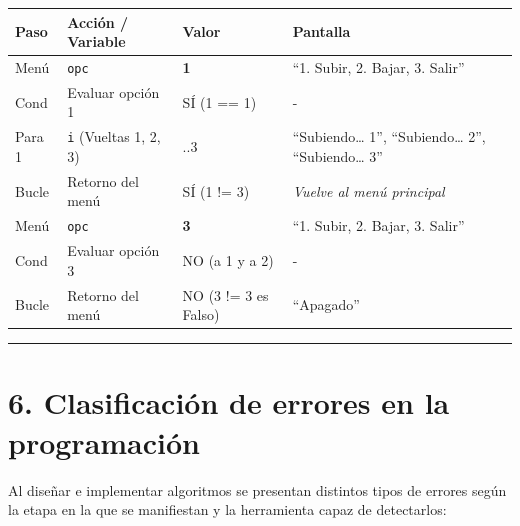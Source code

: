 {\def\LTcaptype{none} %
\begin{longtable}[]{@{}
  >{\centering\arraybackslash}p{}
  >{\centering\arraybackslash}p{}
  >{\centering\arraybackslash}p{}
  >{\raggedright\arraybackslash}p{}@{}}
\toprule\noalign{}
\begin{minipage}[b]{\linewidth}\centering
Paso
\end{minipage} & \begin{minipage}[b]{\linewidth}\centering
Acción / Variable
\end{minipage} & \begin{minipage}[b]{\linewidth}\centering
Valor
\end{minipage} & \begin{minipage}[b]{\linewidth}\raggedright
Pantalla
\end{minipage} \\
\midrule\noalign{}
\endhead
\bottomrule\noalign{}
\endlastfoot
Menú & \texttt{opc} & \textbf{1} & ``1. Subir, 2. Bajar, 3. Salir'' \\
Cond & Evaluar opción 1 & SÍ (1 == 1) & - \\
Para 1 & \texttt{i} (Vueltas 1, 2, 3) & 1..3 & ``Subiendo\ldots{} 1'',
``Subiendo\ldots{} 2'', ``Subiendo\ldots{} 3'' \\
Bucle & Retorno del menú & SÍ (1 != 3) & \emph{Vuelve al menú
principal} \\
Menú & \texttt{opc} & \textbf{3} & ``1. Subir, 2. Bajar, 3. Salir'' \\
Cond & Evaluar opción 3 & NO (a 1 y a 2) & - \\
Bucle & Retorno del menú & NO (3 != 3 es Falso) & ``Apagado'' \\
\end{longtable}
}

\begin{center}\rule{0.5\linewidth}{0.5pt}\end{center}

\section{6. Clasificación de errores en la
programación}\label{clasificaciuxf3n-de-errores-en-la-programaciuxf3n}

Al diseñar e implementar algoritmos se presentan distintos tipos de
errores según la etapa en la que se manifiestan y la herramienta capaz
de detectarlos:

